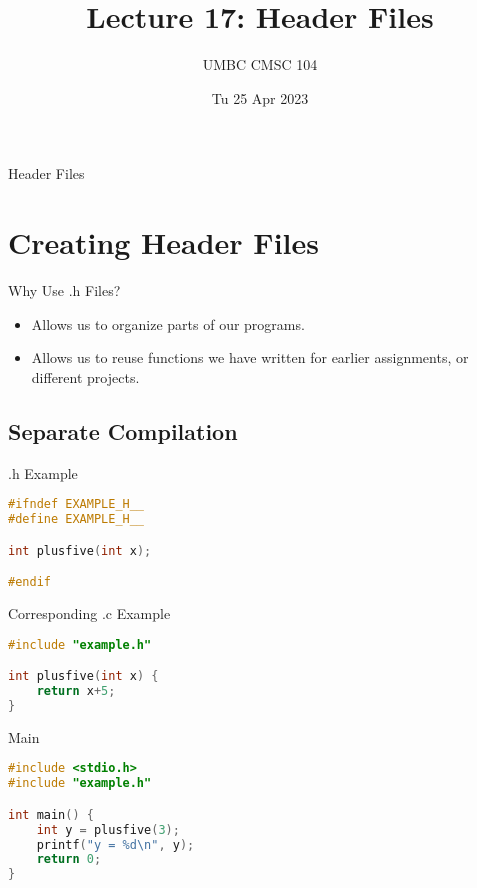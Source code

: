 \documentclass[graphics]{beamer}
\title{Lecture 17: Header Files}
\author{UMBC CMSC 104}
\date{Tu 25 Apr 2023}
\begin{document}
\begin{frame}{}
\centering
    Header Files
\end{frame}

\frame{\tableofcontents}

\section{Creating Header Files}
\begin{frame}{Why Use .h Files?}
    \begin{itemize}
        \item Allows us to organize parts of our programs.
        \item Allows us to reuse functions we have written for earlier assignments, or different projects.
    \end{itemize}
\end{frame}

\subsection{Separate Compilation}
\begin{frame}[fragile]{.h Example}
    \begin{lstlisting}[language=C,basicstyle=\footnotesize,keywordstyle=\color{blue},commentstyle=\color{green},showstringspaces=false,stringstyle=\color{red}]
#ifndef EXAMPLE_H__
#define EXAMPLE_H__

int plusfive(int x);

#endif
    \end{lstlisting}
\end{frame}

\begin{frame}[fragile]{Corresponding .c Example}
    \begin{lstlisting}[language=C,basicstyle=\footnotesize,keywordstyle=\color{blue},commentstyle=\color{green},showstringspaces=false,stringstyle=\color{red}]
#include "example.h"

int plusfive(int x) {
    return x+5;
}
    \end{lstlisting}
\end{frame}

\begin{frame}[fragile]{Main}
    \begin{lstlisting}[language=C,basicstyle=\footnotesize,keywordstyle=\color{blue},commentstyle=\color{green},showstringspaces=false,stringstyle=\color{red}]
#include <stdio.h>
#include "example.h"

int main() {
    int y = plusfive(3);
    printf("y = %d\n", y);
    return 0;
}
    \end{lstlisting}
\end{frame}
\end{document}
